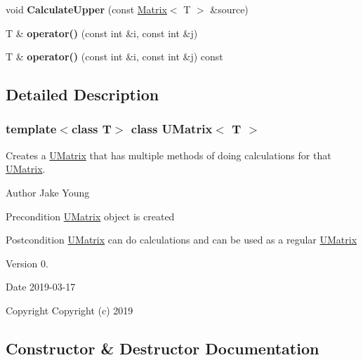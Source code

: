 \begin{DoxyCompactItemize}
\mbox{\label{class_u_matrix_a63af4ca40c18c71bd0609d4511779852}} 
void {\bfseries Calculate\+Upper} (const \mbox{\hyperlink{class_matrix}{Matrix}}$<$ T $>$ \&source)
\item 
\mbox{\label{class_u_matrix_a06c554ab9d6deb7d1950cdd49eb089e0}} 
T \& {\bfseries operator()} (const int \&i, const int \&j)
\item 
\mbox{\label{class_u_matrix_a2fbb6915ab1a6bb7a8944b51600b6d2d}} 
T \& {\bfseries operator()} (const int \&i, const int \&j) const
\end{DoxyCompactItemize}


\subsection{Detailed Description}
\subsubsection*{template$<$class T$>$\newline
class U\+Matrix$<$ T $>$}

Creates a \mbox{\hyperlink{class_u_matrix}{U\+Matrix}} that has multiple methods of doing calculations for that \mbox{\hyperlink{class_u_matrix}{U\+Matrix}}. 

\begin{DoxyAuthor}{Author}
Jake Young 
\end{DoxyAuthor}
\begin{DoxyPrecond}{Precondition}
\mbox{\hyperlink{class_u_matrix}{U\+Matrix}} object is created 
\end{DoxyPrecond}
\begin{DoxyPostcond}{Postcondition}
\mbox{\hyperlink{class_u_matrix}{U\+Matrix}} can do calculations and can be used as a regular \mbox{\hyperlink{class_u_matrix}{U\+Matrix}} 
\end{DoxyPostcond}
\begin{DoxyVersion}{Version}
0. 
\end{DoxyVersion}
\begin{DoxyDate}{Date}
2019-\/03-\/17
\end{DoxyDate}
\begin{DoxyCopyright}{Copyright}
Copyright (c) 2019 
\end{DoxyCopyright}


\subsection{Constructor \& Destructor Documentation}
\mbox{\label{class_u_matrix_ad0d2d3e05ad904daed36504eddd25a2c}} 
